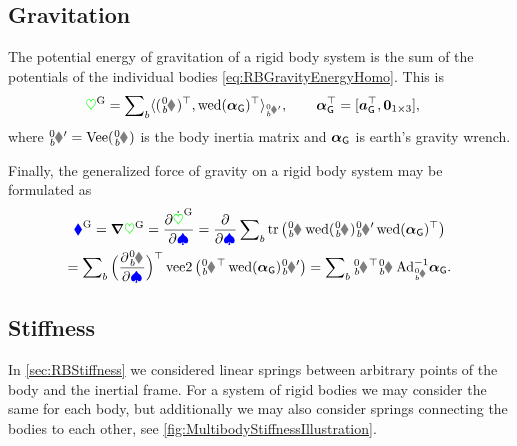 
\subsection{Gravitation}
The potential energy of gravitation of a rigid body system is the sum of the potentials of the individual bodies \eqref{eq:RBGravityEnergyHomo}.
This is
\begin{align}\label{eq:RBSPotentialGravity}
 \potentialGravity
 &= \sumBodies \sProd[\bodyInertiaMatp{0}{\BidxII}]{(\bodyHomoCoord{0}{\BidxII})^\top}{\wedOp(\gravityAccWrench)^\top},
\qquad 
 \gravityAccWrench^\top = [\gravityAcc^\top, \tuple{0}_{1\times3} ],
\end{align}
where $\bodyInertiaMatp{0}{\BidxII} = \veeMatOp(\bodyInertiaMat{0}{\BidxII})$ is the body inertia matrix and $\boldsymbol{\alpha}_{\mathsf{G}}$ is earth's gravity wrench.

Finally, the generalized force of gravity on a rigid body system may be formulated as
\begin{multline}\label{eq:RBSGenForceGravity}
 \genForceGravity = \differential\potentialGravity
 = \frac{\partial \potentialGravityd}{\partial \sysVel}
 = \frac{\partial}{\partial \sysVel} \sumBodies \tr\big( \bodyHomoCoord{0}{\BidxII} \wedOp(\bodyVel{0}{\BidxII}) \bodyInertiaMatp{0}{\BidxII} \wedOp(\gravityAccWrench)^\top \big)
\\ 
 = \sumBodies \Big(\frac{\partial \bodyVel{0}{\BidxII}}{\partial \sysVel}\Big)^\top \veeTwoOp\big( \bodyHomoCoord{0}{\BidxII}^\top \wedOp(\gravityAccWrench) \bodyInertiaMatp{0}{\BidxII} \big) 
 = \sumBodies \bodyJac{0}{\BidxII}^\top \bodyInertiaMat{0}{\BidxII} \, \Ad{\bodyHomoCoord{0}{\BidxII}}^{-1} \gravityAccWrench.
\end{multline}

\subsection{Stiffness}
In \autoref{sec:RBStiffness} we considered linear springs between arbitrary points of the body and the inertial frame.
For a system of rigid bodies we may consider the same for each body, but additionally we may also consider springs connecting the bodies to each other, see \autoref{fig:MultibodyStiffnessIllustration}.

